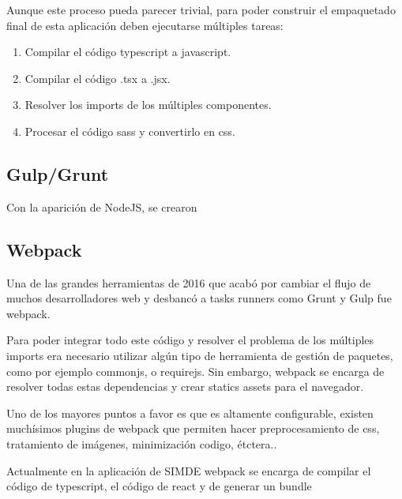 Aunque este proceso pueda parecer trivial, para poder construir el empaquetado final de esta aplicación
deben ejecutarse múltiples tareas:

\begin{enumerate}

\item Compilar el código typescript a javascript.

\item Compilar el código .tsx a .jsx.

\item Resolver los imports de los múltiples componentes.

\item Procesar el código sass y convertirlo en css.

\end{enumerate}

\subsection{Gulp/Grunt}

Con la aparición de NodeJS, se crearon 

\subsection{Webpack}
\bigskip
Una de las grandes herramientas de 2016 que acabó por cambiar el flujo de muchos 
desarrolladores web y desbancó a tasks runners como Grunt y Gulp fue webpack.

\bigskip
Para poder integrar todo este código y resolver el problema de los múltiples imports 
era necesario utilizar algún tipo de herramienta de gestión de paquetes, como por ejemplo 
commonjs, o requirejs. Sin embargo, webpack se encarga de resolver todas estas 
dependencias y crear statics assets para el navegador.

\bigskip
Uno de los mayores puntos a favor es que es altamente configurable, existen muchísimos 
plugins de webpack que permiten hacer preprocesamiento de css, tratamiento de imágenes,
minimización codigo, étctera.. 

\bigskip
Actualmente en la aplicación de SIMDE webpack  se encarga de compilar el código de 
typescript, el código de react y de generar un bundle 